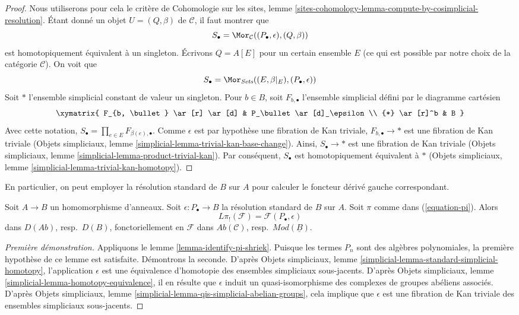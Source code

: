 \begin{proof}
Nous utiliserons pour cela le critère de Cohomologie sur les sites, lemme
\ref{sites-cohomology-lemma-compute-by-cosimplicial-resolution}.
Étant donné un objet $U = (Q, \beta)$ de $\mathcal{C}$, il faut montrer que
$$
S_\bullet = \Mor_\mathcal{C}((P_\bullet, \epsilon), (Q, \beta))
$$
est homotopiquement équivalent à un singleton.
Écrivons $Q = A[E]$ pour un certain ensemble $E$ (ce qui est possible par
notre choix de la catégorie $\mathcal{C}$). On voit que
$$
S_\bullet = \Mor_{\textit{Sets}}((E, \beta|_E), (P_\bullet, \epsilon))
$$
Soit $*$ l'ensemble simplicial constant de valeur un singleton. Pour $b \in B$,
soit $F_{b, \bullet}$ l'ensemble simplicial défini par le diagramme cartésien
$$
\xymatrix{
F_{b, \bullet} \ar[r] \ar[d] & P_\bullet \ar[d]_\epsilon \\
{*} \ar[r]^b & B
}
$$
Avec cette notation, $S_\bullet = \prod_{e \in E} F_{\beta(e), \bullet}$.
Comme $\epsilon$ est par hypothèse une fibration de Kan triviale,
$F_{b, \bullet} \to *$ est une fibration de Kan triviale
(Objets simpliciaux, lemme
\ref{simplicial-lemma-trivial-kan-base-change}). Ainsi,
$S_\bullet \to *$ est une fibration de Kan triviale (Objets simpliciaux,
lemme \ref{simplicial-lemma-product-trivial-kan}). Par conséquent,
$S_\bullet$ est homotopiquement équivalent à $*$ (Objets simpliciaux, lemme
\ref{simplicial-lemma-trivial-kan-homotopy}).
\end{proof}

\noindent
En particulier, on peut employer la résolution standard de $B$ sur $A$ pour
calculer le foncteur dérivé gauche correspondant.

\begin{lemma}
\label{lemma-pi-shriek-standard}
Soit $A \to B$ un homomorphisme d'anneaux. Soit
$\epsilon : P_\bullet \to B$ la résolution standard de $B$ sur $A$.
Soit $\pi$ comme dans (\ref{equation-pi}). Alors
$$
L\pi_!(\mathcal{F}) = \mathcal{F}(P_\bullet, \epsilon)
$$
dans $D(\textit{Ab})$, resp.\ $D(B)$, fonctoriellement en $\mathcal{F}$ dans
$\textit{Ab}(\mathcal{C})$, resp.\ $\textit{Mod}(\underline{B})$.
\end{lemma}

\begin{proof}[Première démonstration]
Appliquons le lemme \ref{lemma-identify-pi-shriek}.
Puisque les termes $P_n$ sont des algèbres polynomiales, la première hypothèse
de ce lemme est satisfaite. Démontrons la seconde. D'après Objets simpliciaux,
lemme \ref{simplicial-lemma-standard-simplicial-homotopy}, l'application
$\epsilon$ est une équivalence d'homotopie des ensembles simpliciaux
sous-jacents. D'après Objets simpliciaux, lemme
\ref{simplicial-lemma-homotopy-equivalence}, il en résulte que $\epsilon$
induit un quasi-isomorphisme des complexes de groupes abéliens associés.
D'après Objets simpliciaux, lemme
\ref{simplicial-lemma-qis-simplicial-abelian-groups}, cela implique que
$\epsilon$ est une fibration de Kan triviale des ensembles simpliciaux
sous-jacents.
\end{proof}

